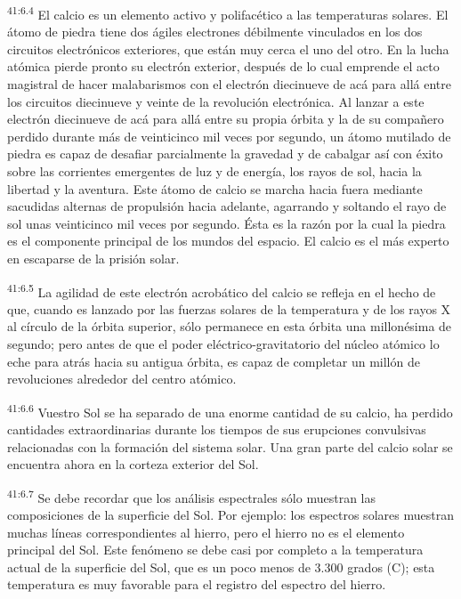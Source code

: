 \par
\textsuperscript{41:6.4} El calcio es un elemento activo y polifacético a las temperaturas solares. El átomo de piedra tiene dos ágiles electrones débilmente vinculados en los dos circuitos electrónicos exteriores, que están muy cerca el uno del otro. En la lucha atómica pierde pronto su electrón exterior, después de lo cual emprende el acto magistral de hacer malabarismos con el electrón diecinueve de acá para allá entre los circuitos diecinueve y veinte de la revolución electrónica. Al lanzar a este electrón diecinueve de acá para allá entre su propia órbita y la de su compañero perdido durante más de veinticinco mil veces por segundo, un átomo mutilado de piedra es capaz de desafiar parcialmente la gravedad y de cabalgar así con éxito sobre las corrientes emergentes de luz y de energía, los rayos de sol, hacia la libertad y la aventura. Este átomo de calcio se marcha hacia fuera mediante sacudidas alternas de propulsión hacia adelante, agarrando y soltando el rayo de sol unas veinticinco mil veces por segundo. Ésta es la razón por la cual la piedra es el componente principal de los mundos del espacio. El calcio es el más experto en escaparse de la prisión solar.

\par
\textsuperscript{41:6.5} La agilidad de este electrón acrobático del calcio se refleja en el hecho de que, cuando es lanzado por las fuerzas solares de la temperatura y de los rayos X al círculo de la órbita superior, sólo permanece en esta órbita una millonésima de segundo; pero antes de que el poder eléctrico-gravitatorio del núcleo atómico lo eche para atrás hacia su antigua órbita, es capaz de completar un millón de revoluciones alrededor del centro atómico.

\par
\textsuperscript{41:6.6} Vuestro Sol se ha separado de una enorme cantidad de su calcio, ha perdido cantidades extraordinarias durante los tiempos de sus erupciones convulsivas relacionadas con la formación del sistema solar. Una gran parte del calcio solar se encuentra ahora en la corteza exterior del Sol.

\par
\textsuperscript{41:6.7} Se debe recordar que los análisis espectrales sólo muestran las composiciones de la superficie del Sol. Por ejemplo: los espectros solares muestran muchas líneas correspondientes al hierro, pero el hierro no es el elemento principal del Sol. Este fenómeno se debe casi por completo a la temperatura actual de la superficie del Sol, que es un poco menos de 3.300 grados (C); esta temperatura es muy favorable para el registro del espectro del hierro.

